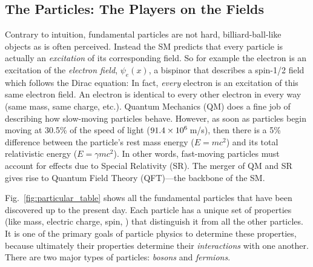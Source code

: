 \subsection{The Particles: The Players on the Fields}
Contrary to intuition, fundamental particles are not hard, billiard-ball-like objects as is often perceived.
Instead the SM predicts that every particle is actually an \emph{excitation} of its corresponding field.
So for example the electron is an excitation of the \emph{electron field}, $\psi_{e}(x)$, a bispinor that describes a spin-1/2 field which follows the Dirac equation: 
In fact, \emph{every} electron is an excitation of this same electron field. 
An electron is identical to every other electron in every way (same mass, same charge, etc.).
Quantum Mechanics (QM) does a fine job of describing how slow-moving particles behave.
However, as soon as particles begin moving at 30.5\% of the speed of light ($91.4\times \text{10}^\text{6}$\,m/s), then there is a 5\% difference between the particle's rest mass energy ($E = mc^2$) and its total relativistic energy ($E = \gamma mc^2$).
In other words, fast-moving particles must account for effects due to Special Relativity (SR).
The merger of QM and SR gives rise to Quantum Field Theory (QFT)---the backbone of the SM.

Fig.~\ref{fig:particular_table} shows all the fundamental particles that have been discovered up to the present day.
Each particle has a unique set of properties (like mass, electric charge, spin, \etc) that distinguish it from all the other particles. 
It is one of the primary goals of particle physics to determine these properties, because ultimately their properties determine their \emph{interactions} with one another. 
There are two major types of particles: \emph{bosons} and \emph{fermions}.

